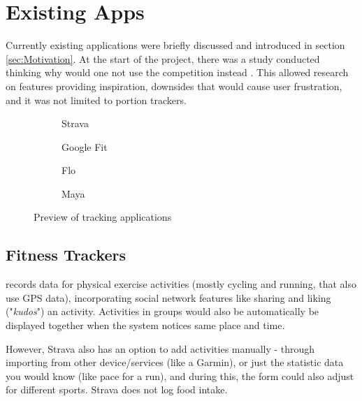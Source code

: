 \documentclass[../main.tex]{subfiles}
\begin{document}
\section{Existing Apps}

Currently existing applications were briefly discussed and introduced in section \ref{sec:Motivation}. At the start of the project, there was a study conducted thinking why would one not use the competition instead \cite{wikiResearch}. This allowed research on features providing inspiration, downsides that would cause user frustration, and it was not limited to portion trackers.

\begin{figure}
    \centering
    \noindent\begin{subfigure}{.24\textwidth}
    \centering
    \caption{Strava}
    \end{subfigure}\hfill
    \begin{subfigure}{.24\textwidth}
    \centering
    \caption{Google Fit}
    \end{subfigure}\hfill
    \begin{subfigure}{.24\textwidth}
    \centering
    \caption{Flo}
    \end{subfigure}\hfill
    \begin{subfigure}{.24\textwidth}
    \centering
    \caption{Maya}
    \end{subfigure}
    \caption{Preview of tracking applications}
\end{figure}

\subsection*{Fitness Trackers}

\textbf{} records data for physical exercise activities (mostly cycling and running, that also use GPS data), incorporating social network features like sharing and liking ("\textit{kudos}") an activity. Activities in groups would also be automatically be displayed together when the system notices same place and time.

However, Strava also has an option to add activities manually - through importing from other device/services (like a Garmin), or just the statistic data you would know (like pace for a run), and during this, the form could also adjust for different sports. Strava does not log food intake.
\end{document}
